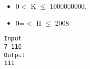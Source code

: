 \begin{itemize}
	\item     0$<$ K  $\le$ 1000000000.   
	\item     0=$<$ H  $\le$ 2008.   
\end{itemize}
\begin{verbatim}
Input
7 110
Output
111
\end{verbatim}